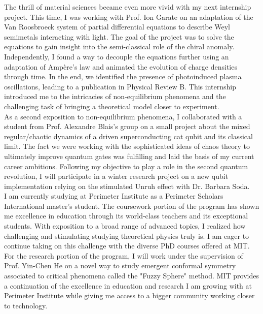 \documentclass[12pt]{article}
\begin{document}
The thrill of material sciences became even more vivid with my next internship project. This time, I was working with Prof. Ion Garate on an adaptation of the Van Roosbroeck system of partial differential equations to describe Weyl semimetals interacting with light. The goal of the project was to solve the equations to gain insight into the semi-classical role of the chiral anomaly. Independently, I found a way to decouple the equations further using an adaptation of Ampère's law and animated the evolution of charge densities through time. In the end, we identified the presence of photoinduced plasma oscillations, leading to a publication in Physical Review B. This internship introduced me to the intricacies of non-equilibrium phenomena and the challenging task of bringing a theoretical model closer to experiment.\\[0.2cm] 

As a second exposition to non-equilibrium phenomena, I collaborated with a student from Prof. Alexandre Blais's group on a small project about the mixed regular/chaotic dynamics of a driven superconducting cat qubit and its classical limit. The fact we were working with the sophisticated ideas of chaos theory to ultimately improve quantum gates was fulfilling and laid the basis of my current career ambitions. Following my objective to play a role in the second quantum revolution, I will participate in a winter research project on a new qubit implementation relying on the stimulated Unruh effect with Dr. Barbara Soda. \\[0.2cm]


I am currently studying at Perimeter Institute as a Perimeter Scholars International master's student. The coursework portion of the program has shown me excellence in education through its world-class teachers and its exceptional students. With exposition to a broad range of advanced topics, I realized how challenging and stimulating studying theoretical physics truly is. I am eager to continue taking on this challenge with the diverse PhD courses offered at MIT. For the research portion of the program, I will work under the supervision of Prof. Yin-Chen He on a novel way to study emergent conformal symmetry associated to critical phenomena called the "Fuzzy Sphere" method. MIT provides a continuation of the excellence in education and research I am growing with at Perimeter Institute while giving me access to a bigger community working closer to technology. \\[0.2cm]
\end{document}
